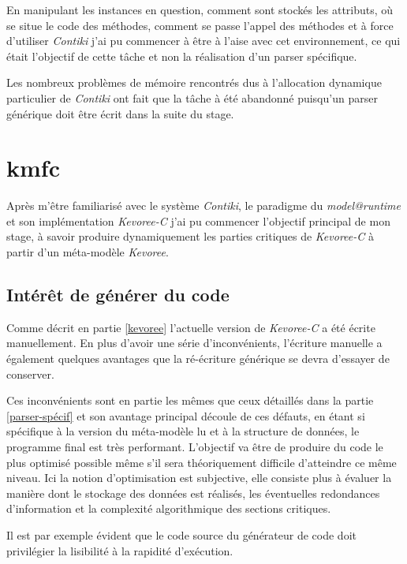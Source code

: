 En manipulant les instances en question, comment sont stockés les attributs, où se situe le code des méthodes, comment se passe l'appel des méthodes et à force d'utiliser \emph{Contiki} j'ai pu commencer à être à l'aise avec cet environnement, ce qui était l'objectif de cette tâche et non la réalisation d'un parser spécifique.

Les nombreux problèmes de mémoire rencontrés dus à l'allocation dynamique particulier de \emph{Contiki} ont fait que la tâche à été abandonné puisqu'un parser générique doit être écrit dans la suite du stage.

\section{kmfc}

Après m'être familiarisé avec le système \emph{Contiki}, le paradigme du \emph{model@runtime} et son implémentation \emph{Kevoree-C} j'ai pu commencer l'objectif principal de mon stage, à savoir produire dynamiquement les parties critiques de \emph{Kevoree-C} à partir d'un méta-modèle \emph{Kevoree}.

\subsection{Intérêt de générer du code}

Comme décrit en partie \ref{kevoree} l'actuelle version de \emph{Kevoree-C} a été écrite manuellement. En plus d'avoir une série d'inconvénients, l'écriture manuelle a également quelques avantages que la ré-écriture générique se devra d'essayer de conserver.

Ces inconvénients sont en partie les mêmes que ceux détaillés dans la partie \ref{parser-spécif} et son avantage principal découle de ces défauts, en étant si spécifique à la version du méta-modèle lu et à la structure de données, le programme final est très performant. L'objectif va être de produire du code le plus optimisé possible même s'il sera théoriquement difficile d'atteindre ce même niveau. Ici la notion d'optimisation est subjective, elle consiste plus à évaluer la manière dont le stockage des données est réalisés, les éventuelles redondances d'information et la complexité algorithmique des sections critiques.

Il est par exemple évident que le code source du générateur de code doit privilégier la lisibilité à la rapidité d'exécution.

